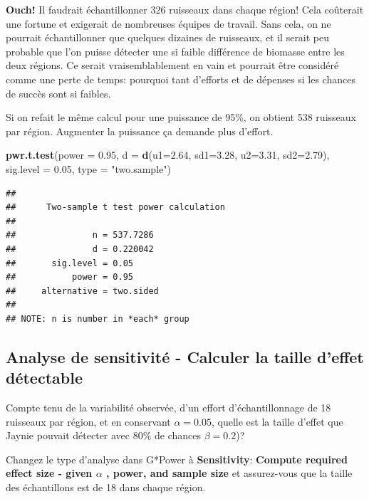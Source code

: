 \documentclass[12pt,]{book}
\makeatletter
\newenvironment{Shaded}{\begin{snugshade}}{\end{snugshade}}
\newcommand{\DataTypeTok}[1]{\textcolor[rgb]{0.27,0.27,0.27}{#1}}
\newcommand{\FloatTok}[1]{\textcolor[rgb]{0.06,0.06,0.06}{#1}}
\newcommand{\KeywordTok}[1]{\textcolor[rgb]{0.27,0.27,0.27}{\textbf{#1}}}
\newcommand{\NormalTok}[1]{#1}
\newcommand{\StringTok}[1]{\textcolor[rgb]{0.5,0.5,0.5}{#1}}
\newenvironment{kframe}{%
\medskip{}
\setlength{\fboxsep}{.8em}
 \def\at@end@of@kframe{}%
 \ifinner\ifhmode%
  \def\at@end@of@kframe{\end{minipage}}%
  \begin{minipage}{\columnwidth}%
 \fi\fi%
 \def\FrameCommand##1{\hskip\@totalleftmargin \hskip-\fboxsep
 \colorbox{shadecolor}{##1}\hskip-\fboxsep
     \hskip-\linewidth \hskip-\@totalleftmargin \hskip\columnwidth}%
 \MakeFramed {\advance\hsize-\width
   \@totalleftmargin\z@ \linewidth\hsize
   \@setminipage}}%
 {\par\unskip\endMakeFramed%
 \at@end@of@kframe}
\newenvironment{rmdblock}[1]
  {
  \begin{itemize}
  \renewcommand{\labelitemi}{
    \raisebox{-.7\height}[0pt][0pt]{
      {\setkeys{Gin}{width=3em,keepaspectratio}\texttt{[image: images/\#1]}}
    }
  }
  \setlength{\fboxsep}{1em}
  \begin{kframe}
  \item
  }
  {
  \end{kframe}
  \end{itemize}
  }
\newenvironment{rmdcode}
  {\begin{rmdblock}{screen}}
  {\end{rmdblock}}
\makeatother
\begin{document}
\textbf{Ouch!} Il faudrait échantillonner 326 ruisseaux dans chaque région! Cela coûterait une fortune et exigerait de nombreuses équipes de travail.
Sans cela, on ne pourrait échantillonner que quelques dizaines de ruisseaux, et il serait peu probable que l'on puisse détecter une si faible différence de biomasse entre les deux régions.
Ce serait vraisemblablement en vain et pourrait être considéré comme une perte de temps: pourquoi tant d'efforts et de dépenses si les chances de succès sont si faibles.

Si on refait le même calcul pour une puissance de 95\%, on obtient 538 ruisseaux par région.
Augmenter la puissance ça demande plus d'effort.

\begin{Shaded}
\begin{Highlighting}[]
\KeywordTok{pwr.t.test}\NormalTok{(}\DataTypeTok{power =} \FloatTok{0.95}\NormalTok{, }\DataTypeTok{d =} \KeywordTok{d}\NormalTok{(}\DataTypeTok{u1=}\FloatTok{2.64}\NormalTok{, }\DataTypeTok{sd1=}\FloatTok{3.28}\NormalTok{, }\DataTypeTok{u2=}\FloatTok{3.31}\NormalTok{, }\DataTypeTok{sd2=}\FloatTok{2.79}\NormalTok{), }\DataTypeTok{sig.level =} \FloatTok{0.05}\NormalTok{, }\DataTypeTok{type =} \StringTok{"two.sample"}\NormalTok{)}
\end{Highlighting}
\end{Shaded}

\begin{verbatim}
## 
##      Two-sample t test power calculation 
## 
##               n = 537.7286
##               d = 0.220042
##       sig.level = 0.05
##           power = 0.95
##     alternative = two.sided
## 
## NOTE: n is number in *each* group
\end{verbatim}

\hypertarget{analyse-de-sensitivituxe9---calculer-la-taille-deffet-duxe9tectable}{%
\subsection{Analyse de sensitivité - Calculer la taille d'effet détectable}\label{analyse-de-sensitivituxe9---calculer-la-taille-deffet-duxe9tectable}}

Compte tenu de la variabilité observée, d'un effort d'échantillonnage de 18 ruisseaux par région, et en conservant \(\alpha=0.05\), quelle est la taille d'effet que Jaynie pouvait détecter avec 80\% de chances \(\beta=0.2\))?

\begin{rmdcode}
Changez le type d'analyse dans G*Power à \textbf{Sensitivity}: \textbf{Compute required effect size - given \(\alpha\) , power, and sample size} et assurez-vous que la taille des échantillons est de 18 dans chaque région.
\end{rmdcode}
\end{document}
